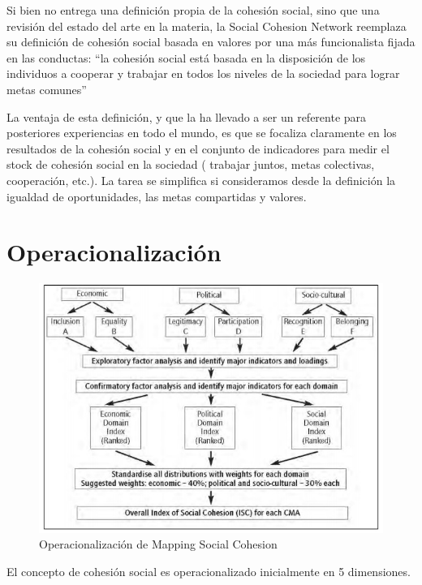 \documentclass[
  12pt,
]{book}
\begin{document}
Si bien \citet{jenson2010defining} no entrega una definición propia de la cohesión social, sino que una revisión del estado del arte en la materia, la Social Cohesion Network reemplaza su definición de cohesión social basada en valores por una más funcionalista fijada en las conductas: ``la cohesión social está basada en la disposición de los individuos a cooperar y trabajar en todos los niveles de la sociedad para lograr metas comunes'' \citep{Jeannote2003}

La ventaja de esta definición, y que la ha llevado a ser un referente para posteriores experiencias en todo el mundo, es que se focaliza claramente en los resultados de la cohesión social y en el conjunto de indicadores para medir el stock de cohesión social en la sociedad ( trabajar juntos, metas colectivas, cooperación, etc.). La tarea se simplifica si consideramos desde la definición la igualdad de oportunidades, las metas compartidas y valores.

\hypertarget{operacionalizaciuxf3n}{%
\section{Operacionalización}\label{operacionalizaciuxf3n}}

\begin{figure}[H]

{\centering \includegraphics[width=0.75\linewidth]{inputs/images/mapping} 

}

\caption{Operacionalización de Mapping Social Cohesion}\label{fig:mapping}
\end{figure}

El concepto de cohesión social es operacionalizado inicialmente en 5
dimensiones.
\end{document}
